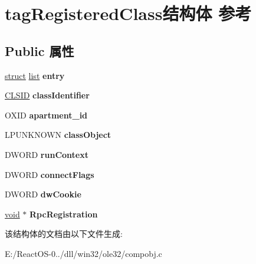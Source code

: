 \hypertarget{structtag_registered_class}{}\section{tag\+Registered\+Class结构体 参考}
\label{structtag_registered_class}
\subsection*{Public 属性}
\begin{DoxyCompactItemize}
\item 
\mbox{\label{structtag_registered_class_a14542be74c0c06a1be7082529d5310d3}} 
\hyperlink{interfacestruct}{struct} \hyperlink{classlist}{list} {\bfseries entry}
\item 
\mbox{\label{structtag_registered_class_a5709eed8996cc56a4c878cc6ac351b4a}} 
\hyperlink{struct___i_i_d}{C\+L\+S\+ID} {\bfseries class\+Identifier}
\item 
\mbox{\label{structtag_registered_class_a5d199e6dbf2d23993d4ef0dc5dc2937a}} 
O\+X\+ID {\bfseries apartment\+\_\+id}
\item 
\mbox{\label{structtag_registered_class_a1bca63d5771147d8e7c5c57d6d103a69}} 
L\+P\+U\+N\+K\+N\+O\+WN {\bfseries class\+Object}
\item 
\mbox{\label{structtag_registered_class_a750623aa32c7c5ca62ab3536025c71bd}} 
D\+W\+O\+RD {\bfseries run\+Context}
\item 
\mbox{\label{structtag_registered_class_ab6df8fedc6483302fa0cf8fb14a01579}} 
D\+W\+O\+RD {\bfseries connect\+Flags}
\item 
\mbox{\label{structtag_registered_class_a71542812961214f96500e801501816f0}} 
D\+W\+O\+RD {\bfseries dw\+Cookie}
\item 
\mbox{\label{structtag_registered_class_a454fe58007ca2616e5a0c45231b6155f}} 
\hyperlink{interfacevoid}{void} $\ast$ {\bfseries Rpc\+Registration}
\end{DoxyCompactItemize}


该结构体的文档由以下文件生成\+:\begin{DoxyCompactItemize}
\item 
E\+:/\+React\+O\+S-\/0../dll/win32/ole32/compobj.\+c\end{DoxyCompactItemize}
